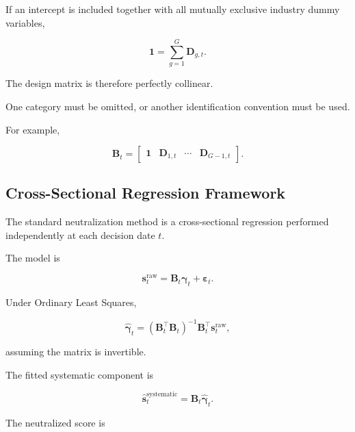 \documentclass[11pt,a4paper]{article}
\begin{document}
If an intercept is included together with all mutually exclusive industry
dummy variables,

\begin{equation}
\mathbf{1}
=
\sum_{g=1}^{G}
\mathbf{D}_{g,t}.
\end{equation}

The design matrix is therefore perfectly collinear.

One category must be omitted, or another identification convention must be
used.

For example,

\begin{equation}
\mathbf{B}_t
=
\begin{bmatrix}
\mathbf{1}
&
\mathbf{D}_{1,t}
&
\cdots
&
\mathbf{D}_{G-1,t}
\end{bmatrix}.
\end{equation}


\subsection{Cross-Sectional Regression Framework}
\label{subsec:cross_sectional_neutralization}

The standard neutralization method is a cross-sectional regression performed
independently at each decision date $t$.

The model is

\begin{equation}
\boxed{
\mathbf{s}_t^{\mathrm{raw}}
=
\mathbf{B}_t
\boldsymbol{\gamma}_t
+
\boldsymbol{\varepsilon}_t.
}
\end{equation}

Under Ordinary Least Squares,

\begin{equation}
\widehat{\boldsymbol{\gamma}}_t
=
\left(
\mathbf{B}_t^\top
\mathbf{B}_t
\right)^{-1}
\mathbf{B}_t^\top
\mathbf{s}_t^{\mathrm{raw}},
\end{equation}

assuming the matrix is invertible.

The fitted systematic component is

\begin{equation}
\widehat{\mathbf{s}}_t^{\mathrm{systematic}}
=
\mathbf{B}_t
\widehat{\boldsymbol{\gamma}}_t.
\end{equation}

The neutralized score is
\end{document}
